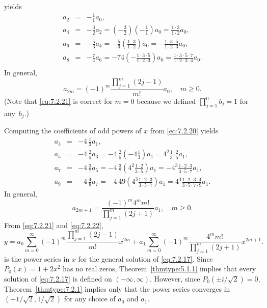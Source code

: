 \documentclass{ximera}
\begin{document}
\begin{example}
\begin{explanation}
yields
\begin{eqnarray*}
a_2&=&-\frac{1}{1}a_0,\\
a_4&=&-\frac{3}{2}a_2=\left(-\frac{3}{2}\right)\left(-\frac{1}{1}\right)a_0
=\frac{1\cdot3}{1\cdot2}a_0,
\\ a_6&=&-\frac{5}{3}a_4=
-\frac{5}{3}\left(\frac{1\cdot3}{1\cdot2}\right)a_0
=-\frac{1\cdot3\cdot5}{1\cdot2\cdot3}a_0, \\
a_8&=&-\frac{7}{4}a_6=-{7}{4}
\left(-\frac{1\cdot3\cdot5}{1\cdot2\cdot3}\right)a_0=
\frac{1\cdot3\cdot5\cdot7}{1\cdot2\cdot3\cdot4}a_0.\\
\end{eqnarray*}
In general,
\begin{equation}\label{eq:7.2.21}
a_{2m}=(-1)^m\frac{\prod_{j=1}^m(2j-1)}{m!}a_0,\quad m\geq0.
\end{equation}
(Note that \eqref{eq:7.2.21} is correct for $m=0$  because we
defined $\prod_{j=1}^0b_j=1$  for any~$b_j$.)

Computing the coefficients of odd powers of $x$ from \eqref{eq:7.2.20}
yields
\begin{eqnarray*}
a_3&=&-4\,\frac{1}{3}a_1, \\
a_5&=&-4\,\frac{2}{5}a_3=-4\,\frac{2}{5}\left(-4\frac{1}{3}\right)a_1
=4^2\frac{1\cdot2}{3\cdot5}a_1,
\\ a_7&=&-4\,\frac{3}{7}a_5=-4\,\frac{3}{7}\left(
4^2\frac{1\cdot2}{3\cdot5}\right)a_1=
-4^3\frac{1\cdot2\cdot3}{3\cdot5\cdot7}a_1,\\
a_9&=&-4\, \frac{4}{9}a_7=-4\, {4}{9}\left(
4^3\frac{1\cdot2\cdot3}{3\cdot5\cdot7}\right)a_1=
4^4\frac{1\cdot2\cdot3\cdot4}{3\cdot5\cdot7\cdot9}a_1.
\end{eqnarray*}
In general,
\begin{equation}\label{eq:7.2.22}
a_{2m+1}=\frac{(-1)^m4^m m!}{\prod_{j=1}^m(2j+1)}a_1,\quad m\geq0.
\end{equation}
From \eqref{eq:7.2.21} and \eqref{eq:7.2.22},
$$
y=a_0
 \sum^\infty_{m=0}(-1)^m \frac{\prod_{j=1}^m(2j-1)}{m!}x^{2m}
+a_1 \sum^\infty_{m=0}(-1)^m \frac{4^mm!}{\prod_{j=1}^m(2j+1)}
 x^{2m+1}.
$$
is the power series in $x$ for the general solution of \eqref{eq:7.2.17}.
Since $P_0(x)=1+2x^2$ has no real zeros, Theorem~\ref{thmtype:5.1.1} implies
that every solution of \eqref{eq:7.2.17} is defined on $(-\infty,\infty)$.
However, since $P_0(\pm i/\sqrt2)=0$, Theorem~\ref{thmtype:7.2.1} implies
only that the power series converges in $(-1/\sqrt2,1/\sqrt2)$ for any
choice of $a_0$ and $a_1$.
\end{explanation}
\end{example}
\end{document}
